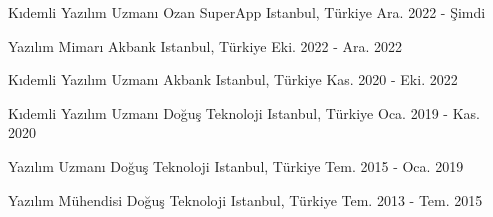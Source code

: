 

\begin{cventries}

  \cventry
    {Kıdemli Yazılım Uzmanı} %
    {Ozan SuperApp} %
    {Istanbul, Türkiye} %
    {Ara. 2022 - Şimdi} %
    {}

  \cventry
    {Yazılım Mimarı} %
    {Akbank} %
    {Istanbul, Türkiye} %
    {Eki. 2022 - Ara. 2022} %
    {}

  \cventry
    {Kıdemli Yazılım Uzmanı} %
    {Akbank} %
    {Istanbul, Türkiye} %
    {Kas. 2020 - Eki. 2022} %
    {}

  \cventry
    {Kıdemli Yazılım Uzmanı} %
    {Doğuş Teknoloji} %
    {Istanbul, Türkiye} %
    {Oca. 2019 - Kas. 2020} %
    {}

  \cventry
    {Yazılım Uzmanı} %
    {Doğuş Teknoloji} %
    {Istanbul, Türkiye} %
    {Tem. 2015 - Oca. 2019} %
    {}

  \cventry
    {Yazılım Mühendisi} %
    {Doğuş Teknoloji} %
    {Istanbul, Türkiye} %
    {Tem. 2013 - Tem. 2015} %
    {}

\end{cventries}
